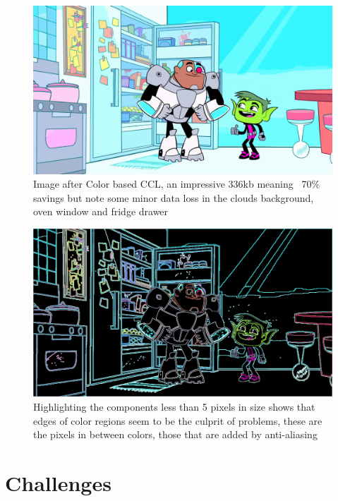\documentclass[12pt]{article}
\begin{document}
    \begin{figure}[h!]
        \centering
        \includegraphics[width=\textwidth]{CCL.png}
        \caption[CCL]{Image after Color based CCL, an impressive 336kb meaning ~70\% savings but note some minor data
        loss in the clouds background, oven window and fridge drawer}
        \label{fig:CCL}
    \end{figure}

    \begin{figure}[h!]
        \centering
        \includegraphics[width=\textwidth]{SmallComponents.png}
        \caption[SmallComponents]{Highlighting the components less than 5 pixels in size shows that edges of color
        regions seem to be the culprit of problems, these are the pixels in between colors, those that are added by
        anti-aliasing}
        \label{fig:smallcomponents}
    \end{figure}

    \pagebreak


    \section{Challenges}\label{sec:challenges}
\end{document}
